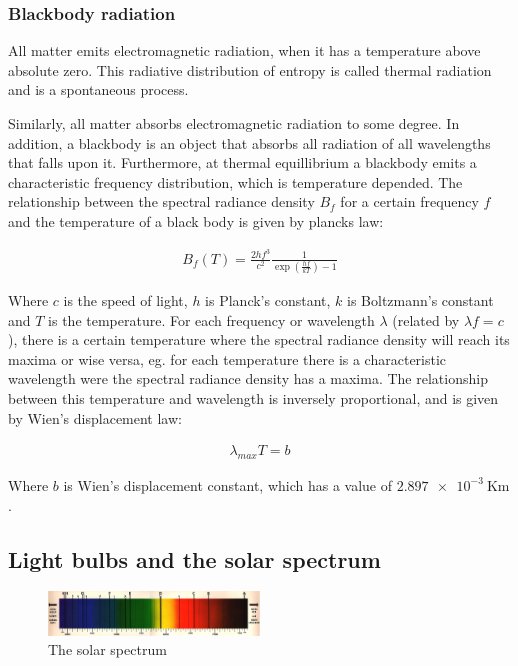 \subsubsection{Blackbody radiation}
All matter emits electromagnetic radiation, when it has a temperature above absolute zero. This radiative distribution of entropy is called thermal radiation and is a spontaneous process.

Similarly, all matter absorbs electromagnetic radiation to some degree. In addition, a blackbody is an object that absorbs all radiation of all wavelengths that falls upon it. Furthermore, at thermal equillibrium a blackbody emits a characteristic frequency distribution, which is temperature depended. The relationship between the spectral radiance density $B_f$ for a certain frequency $f$ and the temperature of a black body is given by plancks law:

\begin{align}
B_{f}(T)= \frac{2hf^3}{c^2}\frac{1}{\exp(\frac{hf}{kT})-1}
\label{planck}
\end{align}

Where $c$ is the speed of light, $h$ is Planck's constant, $k$ is Boltzmann's constant and $T$ is the temperature. For each frequency or wavelength $\lambda$ (related by $\lambda f = c$), there is a certain temperature where the spectral radiance density will reach its maxima or wise versa, eg. for each temperature there is a characteristic wavelength were the spectral radiance density has a maxima. The relationship between this temperature and wavelength is inversely proportional, and is given by Wien's displacement law:

\begin{align}
\lambda_{max}T=b
\label{wien}
\end{align}

Where $b$ is Wien's displacement constant, which has a value of $\SI{2.897 e-3}{\kelvin \meter}$. 


\subsection{Light bulbs and the solar spectrum}



\begin{figure}[h!]
    \centering
    \includegraphics[width=0.5\textwidth]{solarspectrum}
    \caption{The solar spectrum}
    \label{fig:solarspectrum}
\end{figure}

